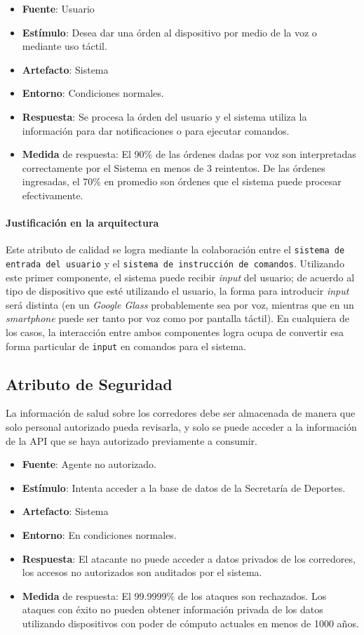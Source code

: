 \begin{itemize}
  \item \textbf{Fuente}: Usuario
  \item \textbf{Estímulo}: Desea dar una órden al dispositivo por medio de la voz o mediante uso táctil.
  \item \textbf{Artefacto}: Sistema
  \item \textbf{Entorno}: Condiciones normales.
  \item \textbf{Respuesta}: Se procesa la órden del usuario y el sistema utiliza la información para dar notificaciones o para ejecutar comandos.
  \item \textbf{Medida} de respuesta: El 90\% de las órdenes dadas por voz son interpretadas correctamente por el Sistema en menos de 3 reintentos. De las órdenes ingresadas, el 70\% en promedio son órdenes que el sistema puede procesar efectivamente.
\end{itemize}

\paragraph{Justificación en la arquitectura} %
Este atributo de calidad se logra mediante la colaboración entre el \texttt{sistema de entrada del usuario} y el \texttt{sistema de instrucción de comandos}. Utilizando este primer componente, el sistema puede recibir \textit{input} del usuario; de acuerdo al tipo de dispositivo que esté utilizando el usuario, la forma para introducir \textit{input} será distinta (en un \emph{Google Glass} probablemente sea por voz, mientras que en un \emph{smartphone} puede ser tanto por voz como por pantalla táctil). En cualquiera de los casos, la interacción entre ambos componentes logra ocupa de convertir esa forma particular de \texttt{input} en comandos para el sistema.


\subsection{Atributo de Seguridad}
La información de salud sobre los corredores debe ser almacenada de manera que solo personal autorizado pueda revisarla, y solo se puede acceder a la información de la API que se haya autorizado previamente a consumir.

\begin{itemize}
  \item \textbf{Fuente}: Agente no autorizado.
  \item \textbf{Estímulo}: Intenta acceder a la base de datos de la Secretaría de Deportes.
  \item \textbf{Artefacto}: Sistema
  \item \textbf{Entorno}: En condiciones normales.
  \item \textbf{Respuesta}: El atacante no puede acceder a datos privados de los corredores, los accesos no autorizados son auditados por el sistema.
  \item \textbf{Medida} de respuesta: El 99.9999\% de los ataques son rechazados. Los ataques con éxito no pueden obtener información privada de los datos utilizando dispositivos con poder de cómputo actuales en menos de 1000 años.
\end{itemize}

